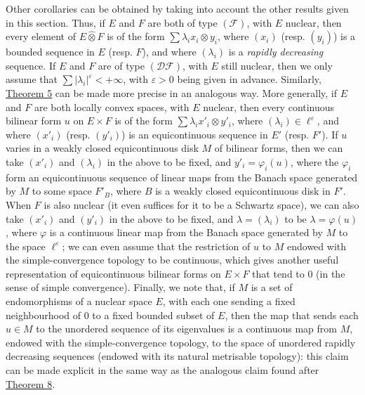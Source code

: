 \documentclass[british]{article}
\newcommand{\oldpage}[1]{\marginpar{\footnotesize$\Big\vert$ \textit{p.~#1}}}
\begin{document}
Other corollaries can be obtained by taking into account the other
results given in this section. Thus, if \(E\) and \(F\) are both of type
\((\mathscr{F})\), with \(E\) nuclear, then every element of
\(E\hat{\otimes}F\) is of the form \(\sum\lambda_i x_i\otimes y_i\),
where \((x_i)\) (resp. \((y_i)\)) is a bounded sequence in \(E\) (resp.
\(F\)), and where \((\lambda_i)\) is a \emph{rapidly decreasing}
sequence. If \(E\) and \(F\) are of type \((\mathscr{DF})\), with \(E\)
still nuclear, then we only assume that
\(\sum|\lambda_i|^\varepsilon<+\infty\), with \(\varepsilon>0\) being
given in advance. Similarly, \hyperref[section-2-theorem-5]{Theorem 5}
can be made more precise in an analogous way. More generally, if \(E\)
and \(F\) are both locally convex spaces, with \(E\) nuclear, then every
continuous bilinear form \(u\) on \(E\times F\) is of the form
\(\sum\lambda_i x'_i\otimes y'_i\), where
\((\lambda_i)\in\ell^\varepsilon\), and where \((x'_i)\) (resp.
\((y'_i)\)) is an equicontinuous sequence in \(E'\) (resp. \(F'\)).
\oldpage{110} If \(u\) varies in a weakly closed equicontinuous disk
\(M\) of bilinear forms, then we can take \((x'_i)\) and \((\lambda_i)\)
in the above to be fixed, and \(y'_i=\varphi_i(u)\), where the
\(\varphi_i\) form an equicontinuous sequence of linear maps from the
Banach space generated by \(M\) to some space \(F'_B\), where \(B\) is a
weakly closed equicontinuous disk in \(F'\). When \(F\) is also nuclear
(it even suffices for it to be a Schwartz space), we can also take
\((x'_i)\) and \((y'_i)\) in the above to be fixed, and
\(\lambda=(\lambda_i)\) to be \(\lambda=\varphi(u)\), where \(\varphi\)
is a continuous linear map from the Banach space generated by \(M\) to
the space \(\ell^\varepsilon\); we can even assume that the restriction
of \(u\) to \(M\) endowed with the simple-convergence topology to be
continuous, which gives another useful representation of equicontinuous
bilinear forms on \(E\times F\) that tend to \(0\) (in the sense of
simple convergence). Finally, we note that, if \(M\) is a set of
endomorphisms of a nuclear space \(E\), with each one sending a fixed
neighbourhood of \(0\) to a fixed bounded subset of \(E\), then the map
that sends each \(u\in M\) to the unordered sequence of its eigenvalues
is a continuous map from \(M\), endowed with the simple-convergence
topology, to the space of unordered rapidly decreasing sequences
(endowed with its natural metrisable topology): this claim can be made
explicit in the same way as the analogous claim found after
\hyperref[section-2-theorem-8]{Theorem 8}.
\end{document}
